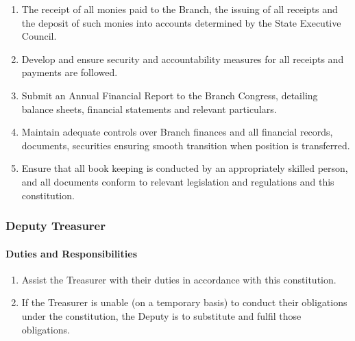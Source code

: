 \documentclass[a4paper,titlepage,8.5pt]{article}
\newcommand{\stateorterritory}{State}
\begin{document}
\begin{enumerate}
\item The receipt of all monies paid to the Branch, the issuing of all receipts and the deposit of such monies into accounts determined by the {\stateorterritory} Executive Council.
\item Develop and ensure security and accountability measures for all receipts and payments are followed.
\item Submit an Annual Financial Report to the Branch Congress, detailing balance sheets, financial statements and relevant particulars.
\item Maintain adequate controls over Branch finances and all financial records, documents, securities ensuring smooth transition when position is transferred.
\item Ensure that all book keeping is conducted by an appropriately skilled person, and all documents conform to relevant legislation and regulations and this constitution.

\iftoggle{WA} {


 \item Fulfil the requirements and obligations of the Agent as defined in the \emph{Electoral Act 1907} (WA) unless the State Council provides otherwise.

}{}

\end{enumerate}

\subsubsection{Deputy Treasurer}

\paragraph{Duties and Responsibilities}

\begin{enumerate}
\item Assist the Treasurer with their duties in accordance with this constitution.
\item If the Treasurer is unable (on a temporary basis) to conduct their obligations under the constitution, the Deputy is to substitute and fulfil those obligations.
\end{enumerate}
\end{document}
